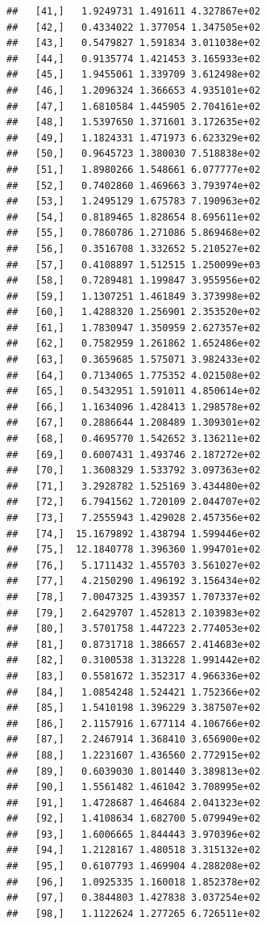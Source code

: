 \documentclass[article]{jss}\usepackage[]{graphicx}\usepackage[]{xcolor}
\makeatletter
\newenvironment{kframe}{%
 \def\at@end@of@kframe{}%
 \ifinner\ifhmode%
  \def\at@end@of@kframe{\end{minipage}}%
  \begin{minipage}{\columnwidth}%
 \fi\fi%
 \def\FrameCommand##1{\hskip\@totalleftmargin \hskip-\fboxsep
 \colorbox{shadecolor}{##1}\hskip-\fboxsep
     \hskip-\linewidth \hskip-\@totalleftmargin \hskip\columnwidth}%
 \MakeFramed {\advance\hsize-\width
   \@totalleftmargin\z@ \linewidth\hsize
   \@setminipage}}%
 {\par\unskip\endMakeFramed%
 \at@end@of@kframe}
\newenvironment{knitrout}{}{} %
\makeatother
\begin{document}
\begin{knitrout}
\begin{kframe}
\begin{verbatim}
##   [41,]   1.9249731 1.491611 4.327867e+02
##   [42,]   0.4334022 1.377054 1.347505e+02
##   [43,]   0.5479827 1.591834 3.011038e+02
##   [44,]   0.9135774 1.421453 3.165933e+02
##   [45,]   1.9455061 1.339709 3.612498e+02
##   [46,]   1.2096324 1.366653 4.935101e+02
##   [47,]   1.6810584 1.445905 2.704161e+02
##   [48,]   1.5397650 1.371601 3.172635e+02
##   [49,]   1.1824331 1.471973 6.623329e+02
##   [50,]   0.9645723 1.380030 7.518838e+02
##   [51,]   1.8980266 1.548661 6.077777e+02
##   [52,]   0.7402860 1.469663 3.793974e+02
##   [53,]   1.2495129 1.675783 7.190963e+02
##   [54,]   0.8189465 1.828654 8.695611e+02
##   [55,]   0.7860786 1.271086 5.869468e+02
##   [56,]   0.3516708 1.332652 5.210527e+02
##   [57,]   0.4108897 1.512515 1.250099e+03
##   [58,]   0.7289481 1.199847 3.955956e+02
##   [59,]   1.1307251 1.461849 3.373998e+02
##   [60,]   1.4288320 1.256901 2.353520e+02
##   [61,]   1.7830947 1.350959 2.627357e+02
##   [62,]   0.7582959 1.261862 1.652486e+02
##   [63,]   0.3659685 1.575071 3.982433e+02
##   [64,]   0.7134065 1.775352 4.021508e+02
##   [65,]   0.5432951 1.591011 4.850614e+02
##   [66,]   1.1634096 1.428413 1.298578e+02
##   [67,]   0.2886644 1.208489 1.309301e+02
##   [68,]   0.4695770 1.542652 3.136211e+02
##   [69,]   0.6007431 1.493746 2.187272e+02
##   [70,]   1.3608329 1.533792 3.097363e+02
##   [71,]   3.2928782 1.525169 3.434480e+02
##   [72,]   6.7941562 1.720109 2.044707e+02
##   [73,]   7.2555943 1.429028 2.457356e+02
##   [74,]  15.1679892 1.438794 1.599446e+02
##   [75,]  12.1840778 1.396360 1.994701e+02
##   [76,]   5.1711432 1.455703 3.561027e+02
##   [77,]   4.2150290 1.496192 3.156434e+02
##   [78,]   7.0047325 1.439357 1.707337e+02
##   [79,]   2.6429707 1.452813 2.103983e+02
##   [80,]   3.5701758 1.447223 2.774053e+02
##   [81,]   0.8731718 1.386657 2.414683e+02
##   [82,]   0.3100538 1.313228 1.991442e+02
##   [83,]   0.5581672 1.352317 4.966336e+02
##   [84,]   1.0854248 1.524421 1.752366e+02
##   [85,]   1.5410198 1.396229 3.387507e+02
##   [86,]   2.1157916 1.677114 4.106766e+02
##   [87,]   2.2467914 1.368410 3.656900e+02
##   [88,]   1.2231607 1.436560 2.772915e+02
##   [89,]   0.6039030 1.801440 3.389813e+02
##   [90,]   1.5561482 1.461042 3.708995e+02
##   [91,]   1.4728687 1.464684 2.041323e+02
##   [92,]   1.4108634 1.682700 5.079949e+02
##   [93,]   1.6006665 1.844443 3.970396e+02
##   [94,]   1.2128167 1.480518 3.315132e+02
##   [95,]   0.6107793 1.469904 4.288208e+02
##   [96,]   1.0925335 1.160018 1.852378e+02
##   [97,]   0.3844803 1.427838 3.037254e+02
##   [98,]   1.1122624 1.277265 6.726511e+02

\end{verbatim}
\end{kframe}
\end{knitrout}
\end{document}
